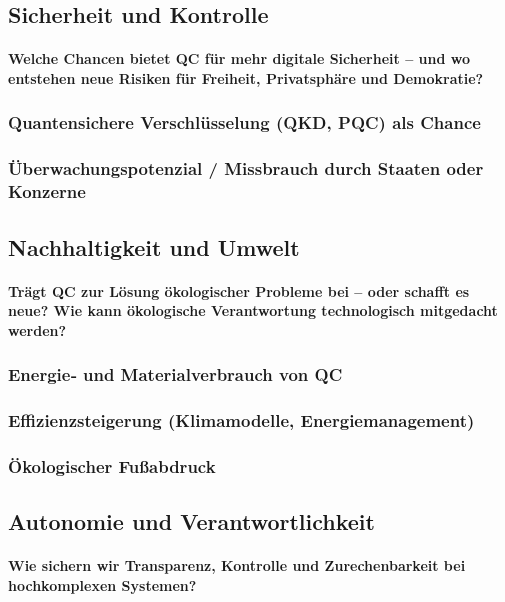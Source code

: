 {\subsection{Sicherheit und Kontrolle}
\paragraph{Welche Chancen bietet QC für mehr digitale Sicherheit – und wo entstehen neue Risiken für Freiheit, Privatsphäre und Demokratie?}

\subsubsection{Quantensichere Verschlüsselung (QKD, PQC) als Chance}
\subsubsection{Überwachungspotenzial / Missbrauch durch Staaten oder Konzerne}

\subsection{Nachhaltigkeit und Umwelt}
\paragraph{Trägt QC zur Lösung ökologischer Probleme bei – oder schafft es neue? 
Wie kann ökologische Verantwortung technologisch mitgedacht werden?
}

\subsubsection{Energie‑ und Materialverbrauch von QC}
\subsubsection{Effizienzsteigerung (Klimamodelle, Energiemanagement)}
\subsubsection{Ökologischer Fußabdruck}

\subsection{Autonomie und Verantwortlichkeit}
\paragraph{Wie sichern wir Transparenz, Kontrolle und Zurechenbarkeit bei hochkomplexen Systemen?}

}
